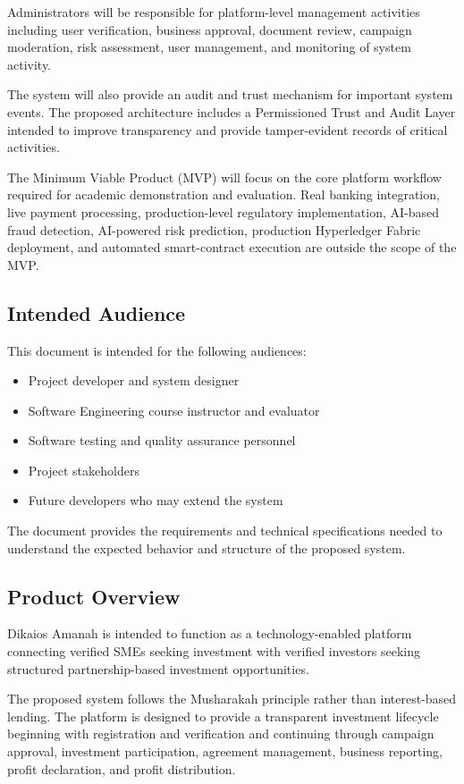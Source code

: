 Administrators will be responsible for platform-level management activities
including user verification, business approval, document review, campaign
moderation, risk assessment, user management, and monitoring of system
activity.

The system will also provide an audit and trust mechanism for important
system events. The proposed architecture includes a Permissioned Trust and
Audit Layer intended to improve transparency and provide tamper-evident
records of critical activities.

The Minimum Viable Product (MVP) will focus on the core platform workflow
required for academic demonstration and evaluation. Real banking
integration, live payment processing, production-level regulatory
implementation, AI-based fraud detection, AI-powered risk prediction,
production Hyperledger Fabric deployment, and automated smart-contract
execution are outside the scope of the MVP.


\subsection{Intended Audience}

This document is intended for the following audiences:

\begin{itemize}
    \item Project developer and system designer
    \item Software Engineering course instructor and evaluator
    \item Software testing and quality assurance personnel
    \item Project stakeholders
    \item Future developers who may extend the system
\end{itemize}

The document provides the requirements and technical specifications needed
to understand the expected behavior and structure of the proposed system.


\subsection{Product Overview}

Dikaios Amanah is intended to function as a technology-enabled platform
connecting verified SMEs seeking investment with verified investors seeking
structured partnership-based investment opportunities.

The proposed system follows the Musharakah principle rather than
interest-based lending. The platform is designed to provide a transparent
investment lifecycle beginning with registration and verification and
continuing through campaign approval, investment participation, agreement
management, business reporting, profit declaration, and profit
distribution.

